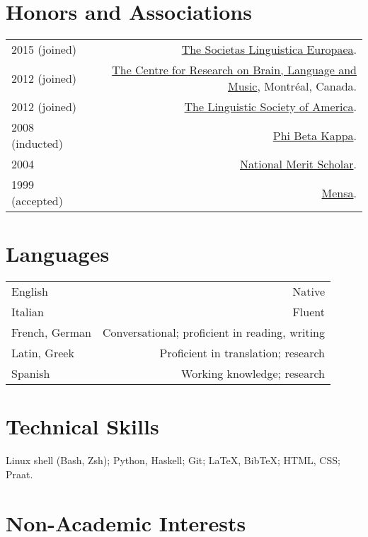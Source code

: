 \documentclass[11pt,letterpaper,twoside]{article}
\makeatletter
\newcommand{\myvrule}{\color{lightgray}\vrule width 1.0pt}
\newenvironment{cvsection}{%
  \renewcommand{\arraystretch}{1.75}
  \begin{longtable}[l]{@{} L R @{}}
}{%
  \end{longtable}
}
\makeatother
\begin{document}
\section*{Honors and Associations}

\begin{cvsection}
  2015 {\footnotesize (joined)} & \href{http://www.societaslinguistica.eu/}{The
    Societas Linguistica Europaea}. \\

  2012 {\footnotesize (joined)} & \href{http://www.crblm.ca/}{The Centre for
    Research on Brain, Language and Music}, Montr\'{e}al, Canada. \\

  2012 {\footnotesize (joined)} &
  \href{http://www.linguisticsociety.org/}{The Linguistic Society of America}. \\

  2008 {\footnotesize (inducted)} & \href{http://www.pbk.org/}{Phi Beta Kappa}. \\

  2004 & \href{http://www.nationalmerit.org/}{National Merit Scholar}. \\

  1999 {\footnotesize (accepted)} & \href{http://www.mensa.org/}{Mensa}. \\
\end{cvsection}

\section*{Languages}

\begin{cvsection}
  English & Native \\
  Italian & Fluent \\
  French, German & Conversational; proficient in reading, writing \\
  Latin, Greek & Proficient in translation; research \\
  Spanish & Working knowledge; research \\
\end{cvsection}

\section*{Technical Skills}

Linux shell (Bash, Zsh); Python, Haskell; Git; \LaTeX, Bib\TeX; HTML, CSS;
Praat.

\section*{Non-Academic Interests}
\end{document}
